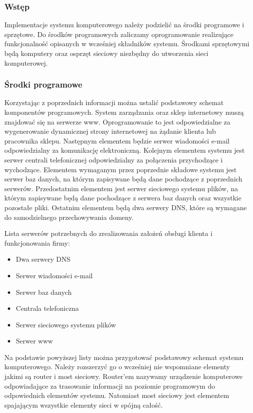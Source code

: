 \subsubsection{Wstęp}
				\par Implementacje systemu komputerowego należy podzielić na środki programowe i sprzętowe. Do środków programowych zaliczamy oprogramowanie realizujące funkcjonalność opisanych w wcześniej składników systemu. Środkami sprzętowymi będą komputery oraz osprzęt sieciowy niezbędny do utworzenia sieci komputerowej.
				
			\subsubsection{Środki programowe}
				\par Korzystając z poprzednich informacji można ustalić podstawowy schemat komponentów programowych. System zarządzania oraz sklep internetowy muszą znajdować się na serwerze www. Oprogramowanie to jest odpowiedzialne za wygenerowanie dynamicznej strony internetowej na żądanie klienta lub pracownika sklepu. Następnym elementem będzie serwer wiadomości e-mail odpowiedzialny za komunikację elektroniczną. Kolejnym elementem systemu jest serwer centrali telefonicznej odpowiedzialny za połączenia przychodzące i wychodzące. Elementem wymaganym przez poprzednie składowe systemu jest serwer baz danych, na którym zapisywane będą dane pochodzące z poprzednich serwerów. Przedostatnim elementem jest serwer sieciowego systemu plików, na którym zapisywane będą dane pochodzące z serwera baz danych oraz wszystkie pozostałe pliki. Ostatnim elementem będą dwa serwery DNS, które są wymagane do samodzielnego przechowywania domeny.
				
				Lista serwerów potrzebnych do zrealizowania założeń obsługi klienta i funkcjonowania firmy: 
				\begin{itemize}
					\item Dwa serwery DNS
					\item Serwer wiadomości e-mail
					\item Serwer baz danych
					\item Centrala telefoniczna
					\item Serwer sieciowego systemu plików
					\item Serwer www
				\end{itemize}
			
				\par Na podstawie powyższej listy można przygotować podstawowy schemat systemu komputerowego. Należy rozszerzyć go o wcześniej nie wspomniane elementy jakimi są router i most sieciowy. Router'em nazywamy urządzenie komputerowe odpowiadające za trasowanie informacji na poziomie programowym do odpowiednich elementów systemu. Natomiast most sieciowy jest elementem spajającym wszystkie elementy sieci w spójną całość.
			
